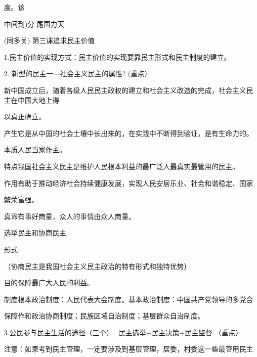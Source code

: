 \documentclass[lang=cn,11pt]{elegantbook}
\begin{document}
度。该\par

中间到)分 尾国力天\par

(同多关) 第三课追求民主价值\par

1.民主价值的实现方式：民主价值的实现要靠民主形式和民主制度的建立。\par

2. 新型的民主一—社会主义民主的属性? (重点）\par

新中国成立后，随着各级人民民主政权的建立和社会主义改造的完成，社会主义民主在中国大地上得\par

以真正确立。\par

产生它是从中国的社会土壤中长出来的，在实践中不断得到验证，是有生命力的。\par

本质人民当家作主。\par

特点我国社会主义民主是维护人民根本利益的最广泛人最真实最管用的民主。\par

作用有助于推动经济社会持续健康发展，实现人民安居乐业、社会和谐稳定、国家\par

繁荣富强。\par

真谛有事好商量，众人的事情由众人商量。\par

选举民主和协商民主\par

形式\par

（协商民主是我国社会主义民主政治的特有形式和独特优势）\par

目的保障最广大人民的利益。\par

制度根本政治制度：人民代表大会制度。基本政治制度：中国共产党领导的多党合\par

保障作和政治协商制度；民族区域自治制度；基层群众自治制度。\par

3.公民参与民主生活的途径（三个）=民主选举+民主决策+民主监督 （重点）\par

注意：如果考到民主管理，一定要涉及到基层管理，居委，村委这一些最管用民主\par
\end{document}
